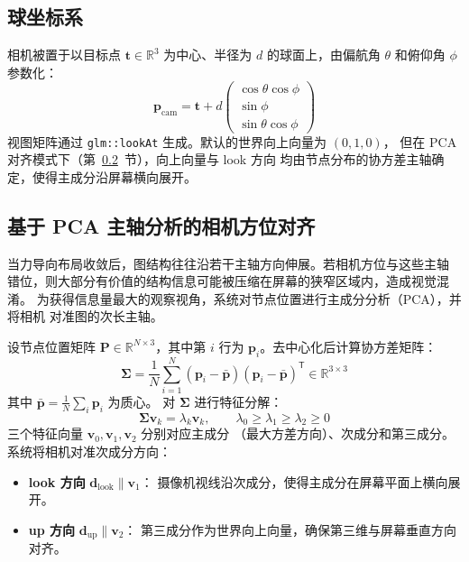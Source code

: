 \documentclass[11pt,a4paper]{report}
\begin{document}
\subsection{球坐标系}
\label{sec:spherical-cam}
相机被置于以目标点 $\mathbf{t} \in \mathbb{R}^3$ 为中心、半径为 $d$
的球面上，由偏航角 $\theta$ 和俯仰角 $\phi$ 参数化：
\begin{equation}
    \mathbf{p}_{\text{cam}} = \mathbf{t} + d
    \begin{pmatrix}
        \cos\theta \cos\phi  \\
        \sin\phi            \\
        \sin\theta \cos\phi
    \end{pmatrix}
    \label{eq:camera-pos}
\end{equation}
视图矩阵通过 \texttt{glm::lookAt} 生成。默认的世界向上向量为 $(0,1,0)$，
但在 PCA 对齐模式下（第~\ref{sec:pca-align}~节），向上向量与 look 方向
均由节点分布的协方差主轴确定，使得主成分沿屏幕横向展开。

\subsection{基于 PCA 主轴分析的相机方位对齐}
\label{sec:pca-align}
当力导向布局收敛后，图结构往往沿若干主轴方向伸展。若相机方位与这些主轴
错位，则大部分有价值的结构信息可能被压缩在屏幕的狭窄区域内，造成视觉混淆。
为获得信息量最大的观察视角，系统对节点位置进行主成分分析（PCA），并将相机
对准图的次长主轴。

设节点位置矩阵 $\mathbf{P} \in \mathbb{R}^{N \times 3}$，其中第 $i$ 行为
$\mathbf{p}_i$。去中心化后计算协方差矩阵：
\begin{equation}
    \bm{\Sigma} = \frac{1}{N} \sum_{i=1}^{N}
        (\mathbf{p}_i - \bar{\mathbf{p}})
        (\mathbf{p}_i - \bar{\mathbf{p}})^{\mathsf{T}}
        \in \mathbb{R}^{3 \times 3}
    \label{eq:pca-cov}
\end{equation}
其中 $\bar{\mathbf{p}} = \frac{1}{N}\sum_i \mathbf{p}_i$ 为质心。
对 $\bm{\Sigma}$ 进行特征分解：
\begin{equation}
    \bm{\Sigma} \mathbf{v}_k = \lambda_k \mathbf{v}_k, \qquad
    \lambda_0 \ge \lambda_1 \ge \lambda_2 \ge 0
    \label{eq:pca-eig}
\end{equation}
三个特征向量 $\mathbf{v}_0, \mathbf{v}_1, \mathbf{v}_2$ 分别对应主成分
（最大方差方向）、次成分和第三成分。系统将相机对准次成分方向：
\begin{itemize}
    \item \textbf{look 方向} $\mathbf{d}_{\text{look}} \parallel \mathbf{v}_1$：
          摄像机视线沿次成分，使得主成分在屏幕平面上横向展开。
    \item \textbf{up 方向} $\mathbf{d}_{\text{up}} \parallel \mathbf{v}_2$：
          第三成分作为世界向上向量，确保第三维与屏幕垂直方向对齐。
\end{itemize}
\end{document}
